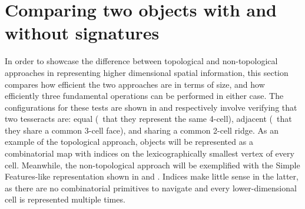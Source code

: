\section{Comparing two objects with and without signatures}
\label{se:ndqueries}

In order to showcase the difference between topological and non-topological approaches in representing higher dimensional spatial information, this section compares how efficient the two approaches are in terms of size, and how efficiently three fundamental operations can be performed in either case.
The configurations for these tests are shown in  and respectively involve verifying that two tesseracts are: equal (\ie\ that they represent the same 4-cell), adjacent (\ie\ that they share a common 3-cell face), and sharing a common 2-cell ridge.
As an example of the topological approach, objects will be represented as a combinatorial map with indices on the lexicographically smallest vertex of every cell.
Meanwhile, the non-topological approach will be exemplified with the Simple Features-like \citep{SimpleFeatures1} representation shown in  and .
Indices make little sense in the latter, as there are no combinatorial primitives to navigate and every lower-dimensional cell is represented multiple times.

